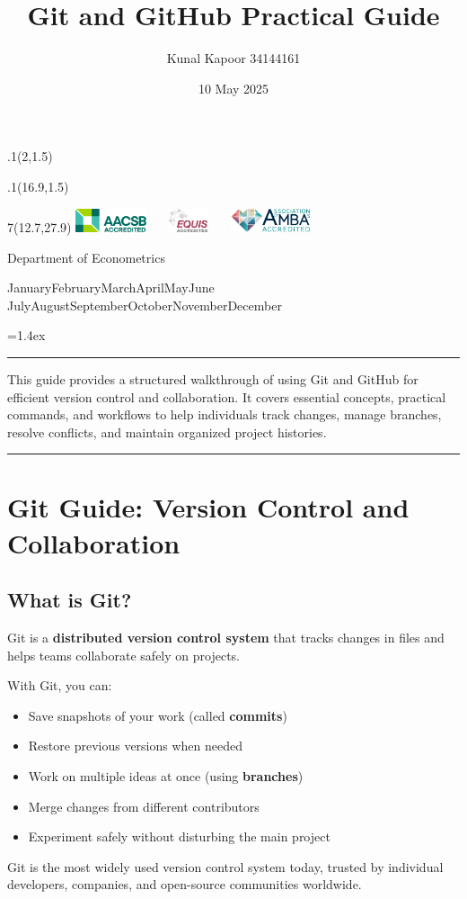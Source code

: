 \documentclass[
  11pt,
  a4paper,
]{article}
\title{Git and GitHub Practical Guide}
\date{10 May 2025}
\author{Kunal Kapoor \textbar{} 34144161}
\makeatletter
\renewcommand*\contentsname{Table of contents}
\newcommand\contentsname{Table of contents}
\def\placefig#1#2#3#4{\begin{textblock}{.1}(#1,#2)\rlap{\texttt{[image: \#4]}}\end{textblock}}
\def\Month{\ifcase\month\or
 January\or February\or March\or April\or May\or June\or
 July\or August\or September\or October\or November\or December\fi}
\def\Year{\number\year}
\def\cover{{\sffamily\setcounter{page}{0}
        \thispagestyle{empty}
        \placefig{2}{1.5}{width=5cm}{monash2}
        \placefig{16.9}{1.5}{width=2.1cm}{MBSportrait}
        \begin{textblock}{7}(12.7,27.9)\hfill
        \includegraphics[height=0.7cm]{AACSB}~~~
        \includegraphics[height=0.7cm]{EQUIS}~~~
        \includegraphics[height=0.7cm]{AMBA}
        \end{textblock}
        \vspace*{2.5cm}
        \begin{center}\Large
        Department of Econometrics\\[.5cm]
        \end{center}\vspace{2cm}
        \begin{center}
        \fbox{\parbox{14cm}{\begin{onehalfspace}\centering\Huge\vspace*{0.3cm}
                \textsf{\textbf{\expandafter{\@title}}}\vspace{1cm}\par
                \LARGE
                \expandafter{\@author}
                \end{onehalfspace}
        }}
        \end{center}
        \vfill
                \begin{center}\Large
                \Month~\Year\\[1cm]

        \end{center}\vspace*{2cm}}}
\def\titlepage{{\cover}}
\let\maketitle\titlepage
\renewenvironment{abstract}{\begin{minipage}{\textwidth}\parskip=1.4ex\noindent
\hrule\vspace{0.1cm}\par{\sffamily\textbf{\abstractname}}\newline\setstretch{1.5}}
  {\end{minipage}}
\makeatother
\begin{document}
\maketitle

\begin{abstract}
This guide provides a structured walkthrough of using Git and GitHub for
efficient version control and collaboration. It covers essential
concepts, practical commands, and workflows to help individuals track
changes, manage branches, resolve conflicts, and maintain organized
project histories.
\end{abstract}

    \vspace{0.25cm}\par\hrule\vspace{0.5cm}\par
  
\renewcommand*\contentsname{Table of contents}
{
\hypersetup{linkcolor=}
\setcounter{tocdepth}{3}
\tableofcontents
}

\newpage

\section{Git Guide: Version Control and
Collaboration}\label{git-guide-version-control-and-collaboration}

\subsection{What is Git?}\label{what-is-git}

Git is a \textbf{distributed version control system} that tracks changes
in files and helps teams collaborate safely on projects.

With Git, you can:

\begin{itemize}
\item
  Save snapshots of your work (called \textbf{commits})
\item
  Restore previous versions when needed
\item
  Work on multiple ideas at once (using \textbf{branches})
\item
  Merge changes from different contributors
\item
  Experiment safely without disturbing the main project
\end{itemize}

Git is the most widely used version control system today, trusted by
individual developers, companies, and open-source communities worldwide.
\end{document}
